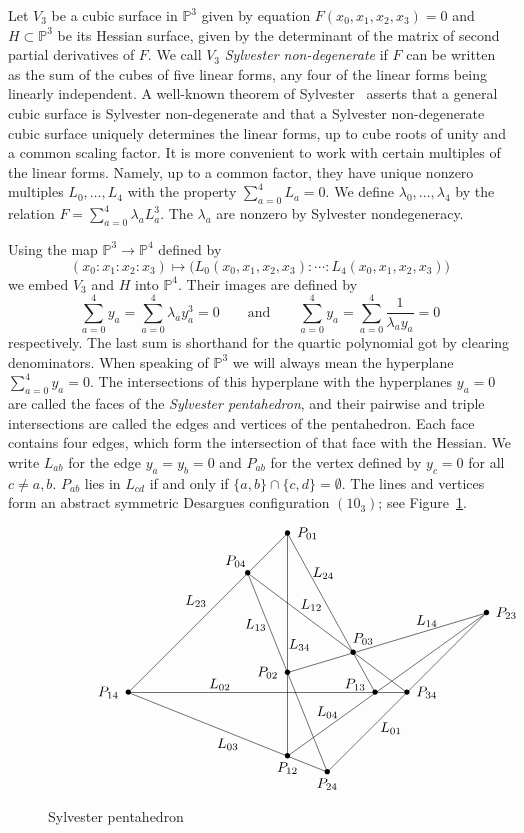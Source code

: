 \documentclass[11pt]{article}
\theoremstyle{definition}
\numberwithin{equation}{section}
\numberwithin{figure}{section}
\numberwithin{table}{section}
\newcommand{\bbP}{{\mathbb{P}}}
\begin{document}
Let $V_3$ be a cubic surface in $\bbP^3$ given by equation $F(x_0,x_1,x_2,x_3) = 0$ and $H\subset \bbP^3$ be its Hessian surface, given by the determinant of the matrix of second partial derivatives of $F$. We call $V_3$ \emph{Sylvester non-degenerate} if $F$ can be written as the sum of the cubes of five linear forms, any four of the linear forms being linearly independent. A well-known theorem of Sylvester~\cite[Theorem~9.4.1]{CAG} asserts that a general cubic surface is Sylvester non-degenerate and that a Sylvester non-degenerate cubic surface uniquely determines the linear forms, up to cube roots of unity and a common scaling factor. It is more convenient to work with certain multiples of the linear forms. Namely, up to a common factor, they have unique nonzero multiples $L_0,\dots,L_4$ with the property $\sum_{a=0}^4L_a=0$. We define $\lambda_0,\dots,\lambda_4$ by the relation $F=\sum_{a=0}^4\lambda_aL_a^3$. The $\lambda_a$ are nonzero by Sylvester nondegeneracy.

Using the map $\bbP^3\to \bbP^4$ defined by
\[
(x_0:x_1:x_2:x_3)\mapsto \bigl
(L_0(x_0,x_1,x_2,x_3){:}\cdots{:} L_4(x_0,x_1,x_2,x_3)\bigr)
\]
we embed $V_3$ and $H$ into $\bbP^4$. Their images are defined by
\[
\sum_{a=0}^4 y_a = \sum_{a=0}^4\lambda_ay_a^3 = 0
\qquad\text{and}\qquad
\sum_{a=0}^4 y_a = \sum_{a=0}^4\frac{1}{\lambda_a y_a} = 0
\]
respectively. The last sum is shorthand for the quartic polynomial got by clearing denominators. When speaking of $\bbP^3$ we will always mean the hyperplane $\sum_{a=0}^4y_a=0$. The intersections of this hyperplane with the hyperplanes $y_a=0$ are called the faces of the \emph{Sylvester pentahedron}, and their pairwise and triple intersections are called the edges and vertices of the pentahedron. Each face contains four edges, which form the intersection of that face with the Hessian. We write $L_{ab}$ for the edge $y_a=y_b=0$ and $P_{ab}$ for the vertex defined by $y_c=0$ for all $c\neq a,b$. $P_{ab}$ lies in $L_{cd}$ if and only if $\{a,b\}\cap\{c,d\}=\emptyset$. The lines and vertices form an abstract symmetric Desargues configuration $(10_3)$; see Figure~\ref{sylvester}.

\begin{figure}[!ht]
\[
\xy (-20,-25)*{}; (0,0)*{};(40,40)*{}**\dir{-};(0,0)*{};(70,0)*{}**\dir{-};(0,0)*{};(50,-20)*{}**\dir{-}; (50,-20)*{};(90,20)*{}**\dir{-};(40,40)*{};(40,-16)*{}**\dir{-};(50,-20)*{};(30,30)*{}**\dir{-}; (40,40)*{};(62,0)*{}**\dir{-};(40,-16)*{};(90,20)*{}**\dir{-};(70,0)*{};(30,30)*{}**\dir{-};(90,20)*{};(40,5)*{}**\dir{-}; @={(0,0),(30,30),(40,40),(70,0),(90,20),(50,-20),(40,-16),(62,0),(40,5),(56.5,10)}@@{*{\bullet}}; (-5,0)*{P_{14}};(27,33)*{P_{04}};(45,40)*{P_{01}};(95,20)*{P_{23}};(75,0)*{P_{34}};(50,-23)*{P_{24}}; (40,-19)*{P_{12}};(35,5)*{P_{02}};(59,13.5)*{P_{03}};(57,2)*{P_{13}}; (17,23)*{L_{23}};(25,-13)*{L_{03}};(23,2)*{L_{02}};(66,-9)*{L_{01}};(43,12)*{L_{34}};(49,30)*{L_{24}}; (32,17)*{L_{13}};(75,18)*{L_{14}};(50,-5)*{L_{04}};(46,22)*{L_{12}};
\endxy
\]
\caption{Sylvester pentahedron}\label{sylvester}
\end{figure}
\end{document}
